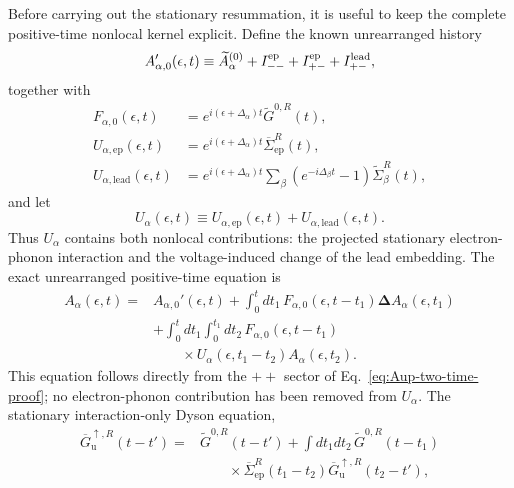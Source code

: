\documentclass[
 reprint,
 superscriptaddress,
 amsmath,amssymb,
 aps,prb,
 longbibliography,
 floatfix
]{revtex4-2}
\newcommand{\ep}{\mathrm{ep}}
\newcommand{\lead}{\mathrm{lead}}
\newcommand{\barSigma}{\overline{\Sigma}}
\begin{document}
Before carrying out the stationary resummation, it is useful to keep the complete positive-time nonlocal kernel explicit. Define the known unrearranged history
\begin{equation*}
A_{\alpha,0}'(\epsilon,t)
\equiv
\widetilde A_\alpha^{(0)}
+I_{--}^{\ep}
+I_{+-}^{\ep}
+I_{+-}^{\rm lead},
\end{equation*}
together with
\begin{align*}
F_{\alpha,0}(\epsilon,t)
&=
e^{i(\epsilon+\Delta_\alpha)t}
\widetilde G^{0,R}(t),
\\
U_{\alpha,\ep}(\epsilon,t)
&=
e^{i(\epsilon+\Delta_\alpha)t}
\barSigma_{\ep}^R(t),
\\
U_{\alpha,\lead}(\epsilon,t)
&=
e^{i(\epsilon+\Delta_\alpha)t}
\sum_\beta
\left(e^{-i\Delta_\beta t}-1\right)
\widetilde\Sigma_\beta^R(t),
\end{align*}
and let
\begin{equation}
U_\alpha(\epsilon,t)
\equiv
U_{\alpha,\ep}(\epsilon,t)
+
U_{\alpha,\lead}(\epsilon,t).
\label{eq:Utotal-up-proof}
\end{equation}
Thus $U_\alpha$ contains both nonlocal contributions: the projected stationary electron-phonon interaction and the voltage-induced change of the lead embedding. The exact unrearranged positive-time equation is
\begin{equation}
\begin{aligned}
A_\alpha(\epsilon,t)
={}&
A_{\alpha,0}'(\epsilon,t)
+
\int_0^t dt_1\,
F_{\alpha,0}(\epsilon,t-t_1)
\bm\Delta
A_\alpha(\epsilon,t_1)
\\
&+
\int_0^t dt_1
\int_0^{t_1}dt_2\,
F_{\alpha,0}(\epsilon,t-t_1)
\\
&\qquad\times
U_\alpha(\epsilon,t_1-t_2)
A_\alpha(\epsilon,t_2).
\end{aligned}
\label{eq:Aup-volterra-unreg-proof}
\end{equation}
This equation follows directly from the $++$ sector of Eq.~\eqref{eq:Aup-two-time-proof}; no electron-phonon contribution has been removed from $U_\alpha$. The stationary interaction-only Dyson equation,
\begin{equation}
\begin{aligned}
\overline G_{\mathrm u}^{\uparrow,R}(t-t')
={}&
\widetilde G^{0,R}(t-t')
+
\int dt_1dt_2\,
\widetilde G^{0,R}(t-t_1)
\\
&\qquad\times
\barSigma_{\ep}^R(t_1-t_2)
\overline G_{\mathrm u}^{\uparrow,R}(t_2-t'),
\end{aligned}
\label{eq:stationary-resum-proof}
\end{equation}
\end{document}

